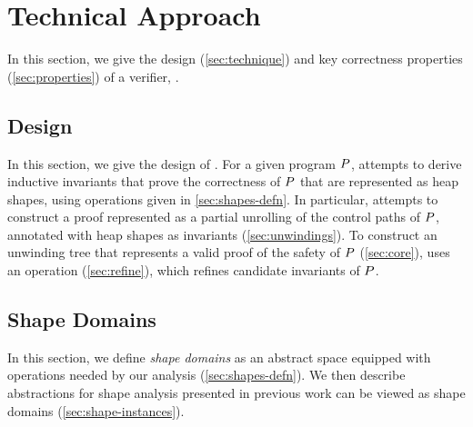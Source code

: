 \section{Technical Approach}
\label{sec:approach}
%
In this section, we give the design (\autoref{sec:technique}) and key
correctness properties (\autoref{sec:properties}) of a \reachprob
verifier, \verifier.

\subsection{\verifier Design}
\label{sec:technique}
In this section, we give the design of \verifier.
%
For a given program $P$, \verifier attempts to derive inductive
invariants that prove the correctness of $P$ that are
represented as heap shapes, using operations given in
\autoref{sec:shapes-defn}.
%
In particular, \verifier attempts to construct a proof represented as
a partial unrolling of the control paths of $P$, annotated with
heap shapes as invariants (\autoref{sec:unwindings}).
%
To construct an unwinding tree that represents a valid proof of the
safety of $P$ (\autoref{sec:core}), \verifier uses an operation
 (\autoref{sec:refine}), which refines candidate invariants of
$P$.

\subsection{Shape Domains}
%
In this section, we define \emph{shape domains} as an abstract space
equipped with operations needed by our analysis
(\autoref{sec:shapes-defn}).
%
We then describe abstractions for shape analysis presented in previous
work can be viewed as shape domains (\autoref{sec:shape-instances}).
%
